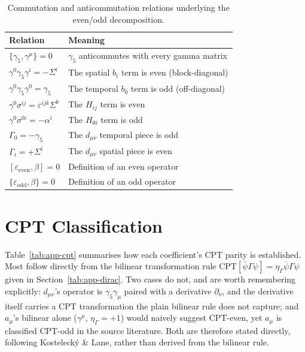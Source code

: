 \documentclass[main]{subfiles}
\begin{document}
\begin{table}[h]
\centering
\begin{tabular}{@{}l>{\raggedright\arraybackslash}p{7cm}@{}}
\toprule
Relation & Meaning \\
\midrule
$\{\gamma_5,\gamma^\mu\}=0$ & $\gamma_5$ anticommutes with every gamma matrix \\
$\gamma^0\gamma_5\gamma^i=-\Sigma^i$ & The spatial $b_i$ term is even (block-diagonal) \\
$\gamma^0\gamma_5\gamma^0=\gamma_5$ & The temporal $b_0$ term is odd (off-diagonal) \\
$\gamma^0\sigma^{ij}=\varepsilon^{ijk}\Sigma^k$ & The $H_{ij}$ term is even \\
$\gamma^0\sigma^{0i}=-\alpha^i$ & The $H_{0i}$ term is odd \\
$\Gamma_0=-\gamma_5$ & The $d_{\mu\nu}$ temporal piece is odd \\
$\Gamma_i=+\Sigma^i$ & The $d_{\mu\nu}$ spatial piece is even \\
$[\varepsilon_{\text{even}},\beta]=0$ & Definition of an even operator \\
$\{\varepsilon_{\text{odd}},\beta\}=0$ & Definition of an odd operator \\
\bottomrule
\end{tabular}
\caption{Commutation and anticommutation relations underlying the even/odd decomposition.}
\label{tab:app-commutation}
\end{table}

\section{CPT Classification}
\label{app:cpt-table}

Table~\ref{tab:app-cpt} summarises how each coefficient's CPT parity is
established. Most follow directly from the bilinear transformation rule
$\mathrm{CPT}[\bar\psi\Gamma\psi]=\eta_\Gamma\bar\psi\Gamma\psi$ given in
Section~\ref{tab:app-dirac}. Two cases do not, and are worth remembering
explicitly: $d_{\mu\nu}$'s operator is $\gamma_5\gamma_\mu$ paired with a
derivative $\partial_\nu$, and the derivative itself carries a CPT
transformation the plain bilinear rule does not capture; and $a_\mu$'s
bilinear alone ($\gamma^\mu$, $\eta_\Gamma=+1$) would naively suggest
CPT-even, yet $a_\mu$ is classified CPT-odd in the source literature. Both
are therefore stated directly, following Kostelecký \& Lane, rather than
derived from the bilinear rule.
\end{document}

